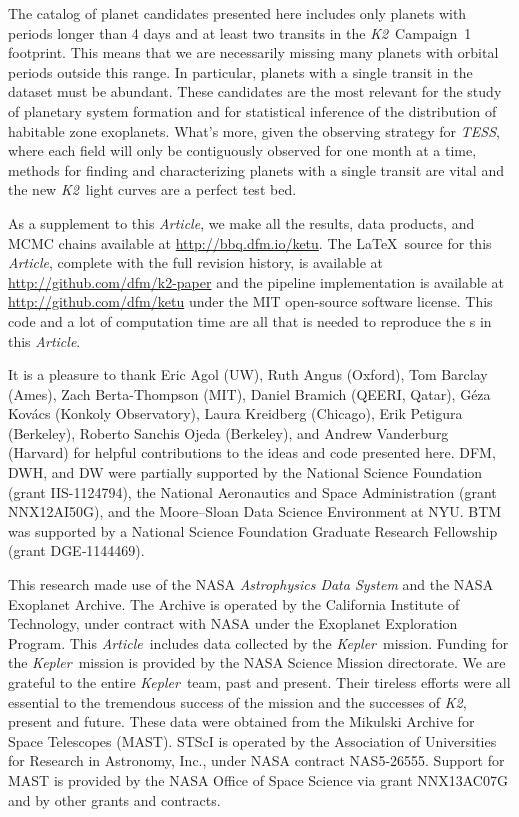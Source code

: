 \documentclass[12pt,preprint]{aastex}
\newcommand{\project}[1]{\textsl{#1}} %
\newcommand{\kepler}{\project{Kepler}}
\newcommand{\KT}{\project{K2}}
\newcommand{\tess}{\project{TESS}}
\newcommand{\paper}{\textsl{Article}}
\newcommand{\datareleaseurl}{{\url{http://bbq.dfm.io/ketu}}}
\begin{document}
The catalog of planet candidates presented here includes only planets with
periods longer than 4 days and at least two transits in the \KT\ Campaign~1
footprint.
This means that we are necessarily missing many planets with orbital periods
outside  this range.
In particular, planets with a single transit in the dataset must be
abundant.
These candidates are the most relevant for the study of planetary system
formation and for statistical inference of the distribution of habitable zone
exoplanets.
What's more, given the observing strategy for \tess, where each field will
only be contiguously observed for one month at a time, methods for finding and
characterizing planets with a single transit are vital and the new \KT\ light
curves are a perfect test bed.

As a supplement to this \paper, we make all the results, data products, and
MCMC chains available at \datareleaseurl.
The \LaTeX\ source for this \paper, complete with the full revision history,
is available at \url{http://github.com/dfm/k2-paper} and the pipeline
implementation is available at \url{http://github.com/dfm/ketu} under the MIT
open-source software license.
This code and a lot of computation time are all that is needed to reproduce
the \figurename s in this \paper.

\acknowledgments
It is a pleasure to thank
Eric Agol (UW),
Ruth Angus (Oxford),
Tom Barclay (Ames),
Zach Berta-Thompson (MIT),
Daniel Bramich (QEERI, Qatar),
G\'eza Kov\'acs (Konkoly Observatory),
Laura Kreidberg (Chicago),
Erik Petigura (Berkeley),
Roberto Sanchis Ojeda (Berkeley),
and
Andrew Vanderburg (Harvard)
for helpful contributions to the ideas and code presented here.
DFM, DWH, and DW were partially supported by the National Science Foundation
(grant IIS-1124794),
the National Aeronautics and Space Administration
(grant NNX12AI50G), and the Moore--Sloan Data Science Environment at NYU.
BTM was supported by a National Science Foundation Graduate Research
Fellowship (grant DGE‐1144469).

This research made use of the NASA \project{Astrophysics Data System} and the
NASA Exoplanet Archive.
The Archive is operated by the California Institute of Technology, under
contract with NASA under the Exoplanet Exploration Program.
This \paper\ includes data collected by the \kepler\ mission. Funding for the
\kepler\ mission is provided by the NASA Science Mission directorate.
We are grateful to the entire \kepler\ team, past and present.
Their tireless efforts were all essential to the tremendous success of the mission
and the successes of \KT, present and future.
These data were obtained from the Mikulski Archive for Space Telescopes
(MAST).
STScI is operated by the Association of Universities for Research in
Astronomy, Inc., under NASA contract NAS5-26555.
Support for MAST is provided by the NASA Office of Space Science via grant
NNX13AC07G and by other grants and contracts.
\end{document}
